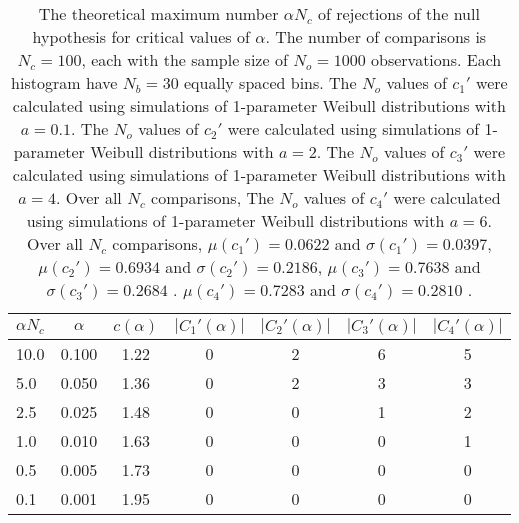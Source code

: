 \begin{table}[h!]
\begin{center}
\begin{tabular}{| l | c | c | c | c | c | c |}\hline
$\alpha N_c$ & $\alpha$ & $c(\alpha)$ & $|C_1'(\alpha)|$ & $|C_2'(\alpha)|$ & $|C_3'(\alpha)|$ & $|C_4'(\alpha)|$ \\\hline
10.0 & 0.100 & 1.22 & 0 & 2 & 6 & 5 \\\hline
5.0 & 0.050 & 1.36 & 0 & 2 & 3 & 3 \\\hline
2.5 & 0.025 & 1.48 & 0 & 0 & 1 & 2 \\\hline
1.0 & 0.010 & 1.63 & 0 & 0 & 0 & 1 \\\hline
0.5 & 0.005 & 1.73 & 0 & 0 & 0 & 0 \\\hline
0.1 & 0.001 & 1.95 & 0 & 0 & 0 & 0 \\\hline
\end{tabular}
\caption{The theoretical maximum number $\alpha N_c$ of rejections
of the null hypothesis for critical values of $\alpha$.
The number of comparisons is $N_c=100$,
each with the sample size of $N_o=1000$ observations.
Each histogram have $N_b=30$ equally spaced bins.
The $N_o$ values of $c_1'$ were calculated using simulations of
 1-parameter Weibull distributions with $a=0.1$.
The $N_o$ values of $c_2'$ were calculated using simulations of
 1-parameter Weibull distributions with $a=2$.
The $N_o$ values of $c_3'$ were calculated using simulations of
 1-parameter Weibull distributions with $a=4$.
Over all $N_c$ comparisons,
The $N_o$ values of $c_4'$ were calculated using simulations of
 1-parameter Weibull distributions with $a=6$.
Over all $N_c$ comparisons,
 $\mu(c_1')=0.0622$ and $\sigma(c_1')=0.0397$,
 $\mu(c_2')=0.6934$ and $\sigma(c_2')=0.2186$,
 $\mu(c_3')=0.7638$ and $\sigma(c_3')=0.2684$ .
 $\mu(c_4')=0.7283$ and $\sigma(c_4')=0.2810$ .
}
\end{center}
\end{table}